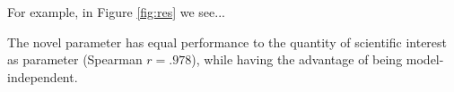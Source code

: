 \documentclass{article}
\begin{document}
For example, in Figure \ref{fig:res} we see... 

The novel parameter has equal performance to the quantity of scientific interest as parameter (Spearman $r=.978$), while having the advantage of being model-independent.

% 

% 

% 
% 
\end{document}
